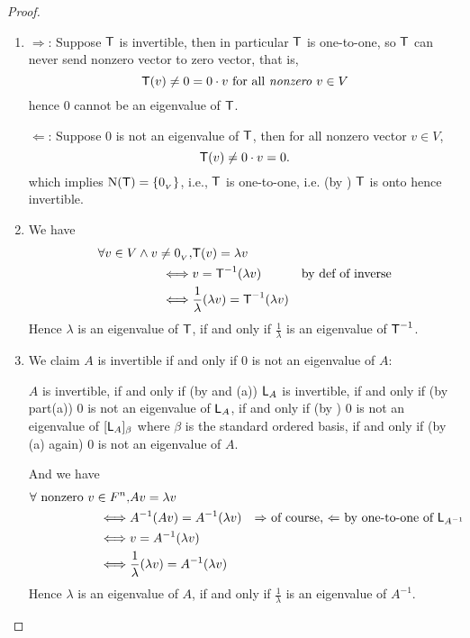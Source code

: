 \begin{proof} \ 

\begin{enumerate}
\item \(\Longrightarrow\): Suppose \(\textsf{T}\) is invertible,
then in particular \(\textsf{T}\) is one-to-one, so \(\textsf{T}\) can never send nonzero vector to zero vector,
that is,
\[
    \textsf{T}(v) \ne 0 = 0 \cdot v \text{ for all \emph{nonzero} \(v \in V\)}
\]
hence \(0\) cannot be an eigenvalue of \(\textsf{T}\).

\(\Longleftarrow\): Suppose \(0\) is not an eigenvalue of \(\textsf{T}\), then for all nonzero vector \(v \in V\),
\[
    \textsf{T}(v) \ne 0 \cdot v = 0.
\]
which implies \(\mathrm{N}(\textsf{T}) = \{ 0_{_V} \}\), i.e., \(\textsf{T}\) is one-to-one, i.e. (by ) \(\textsf{T}\) is onto hence invertible.

\item We have
\begin{align*}
    \forall v \in V \land v \ne 0_{_V}, 
         & \textsf{T}(v) = \lambda v \\
    \iff & v = \textsf{T}^{-1}(\lambda v) & \text{by def of inverse} \\
    \iff & \frac{1}{\lambda} (\lambda v) = \textsf{T}^{-1}(\lambda v)
\end{align*}
Hence \(\lambda\) is an eigenvalue of \(\textsf{T}\), if and only if \(\frac{1}{\lambda}\) is an eigenvalue of \(\textsf{T}^{-1}\).

\item We claim \(A\) is invertible if and only if \(0\) is not an eigenvalue of \(A\):

\(A\) is invertible, if and only if (by  and (a)) \(\textsf{L}_A\) is invertible, if and only if (by part(a)) \(0\) is not an eigenvalue of \(\textsf{L}_A\), if and only if (by ) \(0\) is not an eigenvalue of \([\textsf{L}_A]_{\beta}\) where \(\beta\) is the standard ordered basis, if and only if (by (a) again) \(0\) is not an eigenvalue of \(A\).

And we have
\begin{align*}
    \forall \text{ nonzero } v \in F^n, 
         & Av = \lambda v \\
    \iff & A^{-1}(Av) = A^{-1}(\lambda v) & \text{\(\Rightarrow\) of course, \(\Leftarrow\) by one-to-one of \(\textsf{L}_{A^{-1}}\)} \\
    \iff & v = A^{-1}(\lambda v) \\
    \iff & \frac{1}{\lambda} (\lambda v) = A^{-1}(\lambda v)
\end{align*}
Hence \(\lambda\) is an eigenvalue of \(A\), if and only if \(\frac{1}{\lambda}\) is an eigenvalue of \(A^{-1}\).
\end{enumerate}
\end{proof}

